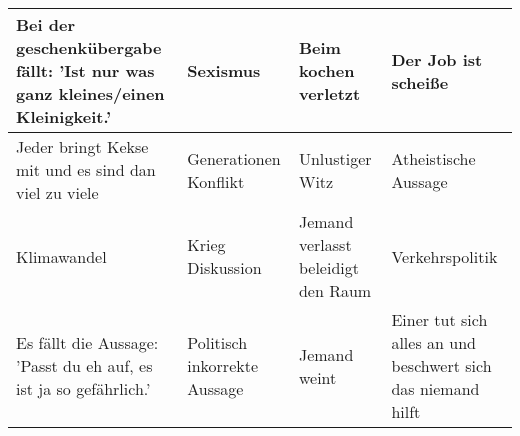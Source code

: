 \begin{table}[h]
\begin{tabularx}{\linewidth}{|X|X|X|X|}
\hline
Bei der geschenkübergabe fällt: 'Ist nur was ganz kleines/einen Kleinigkeit.' & Sexismus & Beim kochen verletzt & Der Job ist scheiße \\ \hline
Jeder bringt Kekse mit und es sind dan viel zu viele & Generationen Konflikt & Unlustiger Witz & Atheistische Aussage \\ \hline
Klimawandel & Krieg Diskussion & Jemand verlasst beleidigt den Raum & Verkehrspolitik \\ \hline
Es fällt die Aussage: 'Passt du eh auf, es ist ja so gefährlich.' & Politisch inkorrekte Aussage & Jemand weint & Einer tut sich alles an und beschwert sich das niemand hilft \\ \hline
\end{tabularx}
\end{table}
